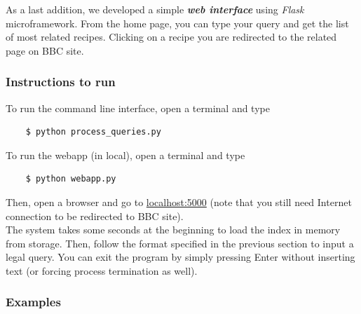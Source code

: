 \medskip

\noindent As a last addition, we developed a simple \textbf{\textit{web interface}} using \textit{Flask}\cite{flask} microframework. From the home page, you can type your query and get the list of most related recipes. Clicking on a recipe you are redirected to the related page on BBC site\cite{bbc}.


\subsubsection{Instructions to run}

To run the command line interface, open a terminal and type
\begin{lstlisting}
	$ python process_queries.py
\end{lstlisting}
To run the webapp (in local), open a terminal and type
\begin{lstlisting}
	$ python webapp.py
\end{lstlisting}
Then, open a browser and go to \url{localhost:5000}  (note that you still need Internet connection to be redirected to BBC site\cite{bbc}).\\
The system takes some seconds at the beginning to load the index in memory from storage. Then, follow the format specified in the previous section to input a legal query. You can exit the program by simply pressing Enter without inserting text (or forcing process termination as well).


\subsubsection{Examples}